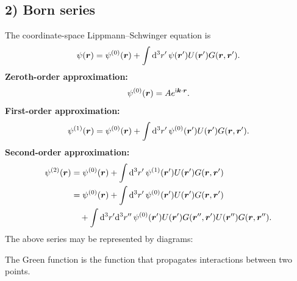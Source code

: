 \subsection*{2) Born series}
The coordinate-space Lippmann--Schwinger equation is
\begin{equation}
\psi(\bm{r})=\psi^{(0)}(\bm{r})
+\int\mathrm{d}^3r'\,\psi(\bm{r}')U(\bm{r}')G(\bm{r},\bm{r}').
\end{equation}
\textbf{Zeroth-order approximation:}
\begin{equation}
\psi^{(0)}(\bm{r})=Ae^{\mathrm{i}\bm{k}\cdot\bm{r}}.
\end{equation}
\textbf{First-order approximation:}
\begin{equation}
\psi^{(1)}(\bm{r})=\psi^{(0)}(\bm{r})
+\int\mathrm{d}^3r'\,\psi^{(0)}(\bm{r}')U(\bm{r}')G(\bm{r},\bm{r}').
\end{equation}
\textbf{Second-order approximation:}
\begin{equation}\begin{aligned}
\psi^{(2)}(\bm{r})
&=\psi^{(0)}(\bm{r})
+\int\mathrm{d}^3r'\,\psi^{(1)}(\bm{r}')U(\bm{r}')G(\bm{r},\bm{r}')\\
&=\psi^{(0)}(\bm{r})
+\int\mathrm{d}^3r'\,\psi^{(0)}(\bm{r}')U(\bm{r}')G(\bm{r},\bm{r}')\\
&\quad+\int\mathrm{d}^3r'\mathrm{d}^3r''\,\psi^{(0)}(\bm{r}')U(\bm{r}')
G(\bm{r}'',\bm{r}')U(\bm{r}'')G(\bm{r},\bm{r}'').
\end{aligned}\end{equation}
The above series may be represented by diagrams:
\begin{center}
\end{center}
The Green function is the function that propagates interactions between two points.